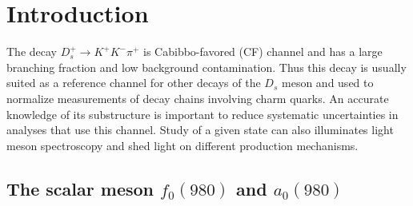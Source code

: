 \section{Introduction}
The decay $D_{s}^{+} \rightarrow K^{+}K^{-}\pi^{+}$ is Cabibbo-favored (CF) channel and has a large branching fraction and low background contamination.
Thus this decay is usually suited as a reference channel for other decays of the $D_{s}$ meson and used to normalize measurements of decay chains involving charm quarks.
An accurate knowledge of its substructure is important to reduce systematic uncertainties in analyses that use this channel.
Study of a given state can also illuminates light meson spectroscopy and shed light on different production mechanisms.
\subsection{The scalar meson $f_{0}(980)$ and $a_{0}(980)$}
\label{f0-a0-discussion}
